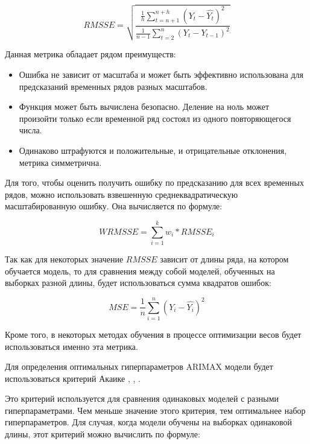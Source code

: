 \begin{equation}\label{eq:rmsse}
	RMSSE = \sqrt{ \frac{ \frac{1}{h} \sum_{t=n+1}^{n+h}(Y_t - \hat{Y_t})^2  }{ \frac{1}{n-1} \sum_{t=2}^{n} (Y_t - Y_{t-1})^2 } }
\end{equation}

Данная метрика обладает рядом преимуществ:

\begin{itemize}
	\item Ошибка не зависит от масштаба и может быть эффективно использована для предсказаний временных рядов разных масштабов.
	\item Функция может быть вычислена безопасно. Деление на ноль может произойти только если временной ряд состоял из одного повторяющегося числа.
	\item Одинаково штрафуются и положительные, и отрицательные отклонения, метрика симметрична.
\end{itemize}

Для того, чтобы оценить получить ошибку по предсказанию для всех временных рядов,
можно использовать взвешенную среднеквадратическую масштабированную ошибку.
Она вычисляется по формуле:

\begin{equation}\label{eq:wrmsse}
	WRMSSE = \sum_{i=1}^{k} w_i * RMSSE_i
\end{equation}

Так как для некоторых значение $ RMSSE $ зависит от длины ряда, на котором обучается
модель, то для сравнения между собой моделей, обученных на выборках разной длины,
будет использоваться сумма квадратов ошибок:

\begin{equation}\label{eq:mse}
	MSE = \frac{1}{n} \sum_{i=1}^{n} (Y_i  - \hat{Y_i})^2
\end{equation}

\noindent Кроме того, в некоторых методах обучения
в процессе оптимизации весов будет использоваться именно эта метрика.


Для определения оптимальных гиперпараметров ARIMAX модели будет использоваться критерий Акаике \cite{sakamoto1986akaike}, \cite{akaike}, \cite{wagenmakers2004aic}.

Это критерий используется для сравнения одинаковых моделей с разными гиперпараметрами.
Чем меньше значение этого критерия, тем оптимальнее набор гиперпараметров.
Для случая, когда модели обучены на выборках одинаковой длины, этот критерий можно вычислить по формуле:

